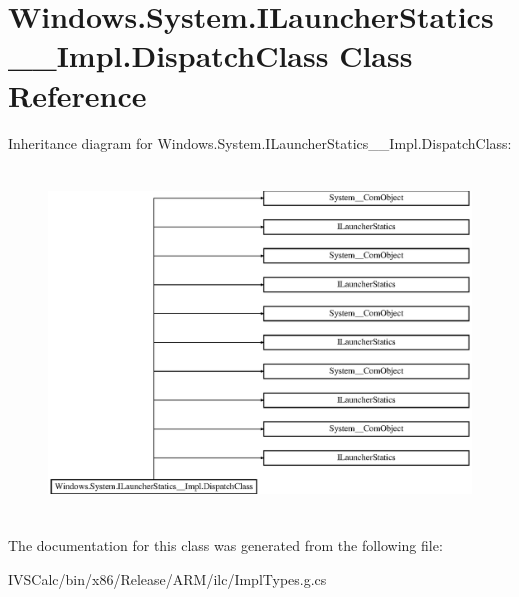 \hypertarget{class_windows_1_1_system_1_1_i_launcher_statics_____impl_1_1_dispatch_class}{}\section{Windows.\+System.\+I\+Launcher\+Statics\+\_\+\+\_\+\+Impl.\+Dispatch\+Class Class Reference}
\label{class_windows_1_1_system_1_1_i_launcher_statics_____impl_1_1_dispatch_class}
Inheritance diagram for Windows.\+System.\+I\+Launcher\+Statics\+\_\+\+\_\+\+Impl.\+Dispatch\+Class\+:\begin{figure}[H]
\begin{center}
\leavevmode
\includegraphics[height=9.277108cm]{class_windows_1_1_system_1_1_i_launcher_statics_____impl_1_1_dispatch_class}
\end{center}
\end{figure}


The documentation for this class was generated from the following file\+:\begin{DoxyCompactItemize}
\item 
I\+V\+S\+Calc/bin/x86/\+Release/\+A\+R\+M/ilc/Impl\+Types.\+g.\+cs\end{DoxyCompactItemize}

